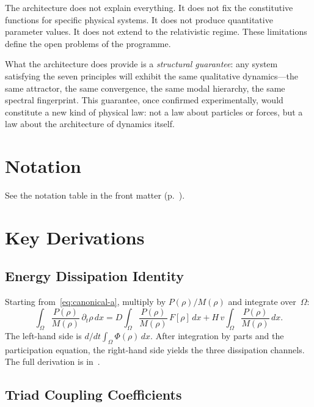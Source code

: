 \documentclass[11pt,twoside,openright]{book}
\theoremstyle{definition}
\theoremstyle{plain}
\theoremstyle{definition}
\theoremstyle{remark}
\newcommand{\Fop}{F[\rho]}
\begin{document}
The architecture does not explain everything. It does not fix the constitutive functions for specific physical systems. It does not produce quantitative parameter values. It does not extend to the relativistic regime. These limitations define the open problems of the programme.

What the architecture does provide is a \emph{structural guarantee}: any system satisfying the seven principles will exhibit the same qualitative dynamics---the same attractor, the same convergence, the same modal hierarchy, the same spectral fingerprint. This guarantee, once confirmed experimentally, would constitute a new kind of physical law: not a law about particles or forces, but a law about the architecture of dynamics itself.


\appendix

\chapter{Notation}\label{app:notation}

See the notation table in the front matter (p.~\pageref{tab:overview}).

\chapter{Key Derivations}\label{app:derivations}

\section{Energy Dissipation Identity}

Starting from~\eqref{eq:canonical-a}, multiply by \(P(\rho)/M(\rho)\) and integrate over~\(\Omega\):
\[
\int_\Omega \frac{P(\rho)}{M(\rho)}\,\partial_t\rho\,dx = D\int_\Omega \frac{P(\rho)}{M(\rho)}\,\Fop\,dx + H\,v\int_\Omega \frac{P(\rho)}{M(\rho)}\,dx.
\]
The left-hand side is \(d/dt\int_\Omega \Phi(\rho)\,dx\). After integration by parts and the participation equation, the right-hand side yields the three dissipation channels. The full derivation is in~\cite{rigour}.

\section{Triad Coupling Coefficients}
\end{document}
